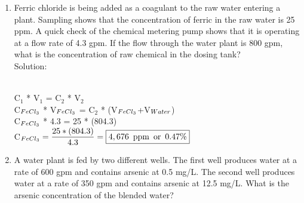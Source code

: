 \vspace{0.2cm}
\begin{enumerate}
\item Ferric chloride is being added as a coagulant to the raw water entering a plant. Sampling shows that the concentration of ferric in the raw water is 25 ppm. A quick check of the chemical metering pump shows that it is operating at a flow rate of 4.3 gpm. If the flow through the water plant is 800 gpm, what is the concentration of raw chemical in the dosing tank?\\
\vspace{0.2cm}
Solution:\\
\vspace{0.3cm}
\\
\vspace{0.2cm}
C$_1$ * V$_1$ = C$_2$ * V$_2$ \\
\vspace{0.2cm}
C$_{\tiny{FeCl_3}}$ * V$_{\tiny{FeCl_3}}$  =  C$_2$ * (V$_{\tiny{FeCl_3}}$+V$_{\tiny{Water}}$)\\
\vspace{0.2cm}
C$_{\tiny{FeCl_3}}$ * 4.3 =  25 * (804.3)\\
\vspace{0.2cm}
C$_{\tiny{FeCl_3}}=\dfrac{25 * (804.3)}{4.3}=\boxed{4,676 \enspace \mathrm{ppm} \enspace \mathrm{or} \enspace 0.47\%}$\\
\vspace{0.3cm}
\item A water plant is fed by two different wells. The first well produces water at a rate of 600 gpm and contains arsenic at 0.5 mg/L. The second well produces water at a rate of 350 gpm and contains arsenic at 12.5 mg/L. What is the arsenic concentration of the blended water?\\

\end{enumerate}
